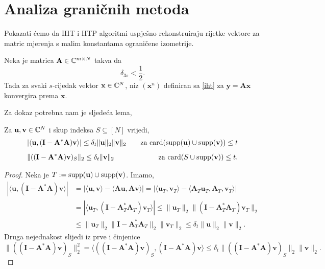 \documentclass[a4paper,twoside,12pt]{memoir} %
\newcommand{\vect}[1]{\mathbf{#1}}
\renewcommand{\vec}{\vect}
\newcommand{\card}{\text{\normalfont{card}}}
\newcommand{\supp}{\text{\normalfont{supp}}}
\newcommand{\norm}[1]{\|{#1}\|}
\begin{document}
\section[Analiza grani\v{c}nih metoda][Analiza grani\v{c}nih metoda]{Analiza grani\v{c}nih metoda}
Pokazati \'cemo da IHT i HTP algoritmi uspje\v{s}no rekonstruiraju rijetke vektore za matric mjerenja s malim konstantama ograni\v{c}ene izometrije.
\begin{thm} \label{tm:6:15}
    Neka je matrica $\vec A \in \C^{m \times N}$ takva da 
    \begin{equation}\label{6:24}
        \delta_{3s} < \frac{1}{2}. 
    \end{equation}
    Tada za svaki $s$-rijedak vektor $\vec x \in \C^N$, niz $(\vec x^n)$ definiran sa \eqref{iht} za $\vec y = \vec {Ax}$ konvergira prema $\vec x$.
\end{thm}
Za dokaz potrebna nam je sljede\'ca lema,
\begin{lem}\label{lem:6:16}
    Za $\vec u, \vec v \in \C^N$ i skup indeksa $S \subseteq [N]$ vrijedi,
    \begin{align*}
        &|\langle \vec u , (\vec I - \vec A^* \vec A)\vec v \rangle|  \leq \delta_t \norm{\vec u}_2 \norm{\vec v}_2 \quad & \text{za } \card(\supp(\vec u) \cup \supp(\vec v))\leq t\\[0.5em]
        &\norm{((\vec I - \vec A^* \vec A)\vec v)_S}_2 \leq \delta_t \norm{\vec v}_2 \quad & \text{za } \card(S \cup \supp(\vec v)) \leq t.
    \end{align*}
\end{lem}
\begin{proof}
    Neka je $T:= \supp(\vec u) \cup \supp(\vec v)$. Imamo,
    \begin{align*}
        |\langle \vec u , (\vec I - \vec A^* \vec A)\vec v \rangle| &= |\langle \vec u, \vec v \rangle - \langle \vec{Au}, \vec{Av} \rangle| = |\langle \vec u_T, \vec v_T \rangle - \langle \vec A_T \vec u_T, \vec A_T, \vec v_T \rangle|\\[0.5em]
        &=|\langle \vec u_T, (\vec I - \vec A^*_T \vec A_T)\vec v_T \rangle| \leq \norm{\vec u_T}_2 \norm{(\vec I - \vec A^*_T \vec A_T)\vec v_T}_2\\[0.5em]
        &\leq \norm{\vec u_T}_2 \norm{\vec I - \vec A^*_T \vec A_T}_2 \norm{\vec v_T}_2 \leq \delta_t \norm{\vec u}_2 \norm{\vec v}_2.
    \end{align*}
    Druga nejednakost slijedi iz prve i \v{c}injenice
    \begin{equation*}
        \norm{((\vec I - \vec A^* \vec A)\vec v)_S}_2^2 = \langle ((\vec I - \vec A^* \vec A)\vec v)_S, (\vec I - \vec A^*\vec A)\vec v \rangle \leq \delta_t \norm{((\vec I - \vec A^*\vec A)\vec v)_S}_2 \norm{\vec v}_2.
    \end{equation*}
\end{proof}
\end{document}
